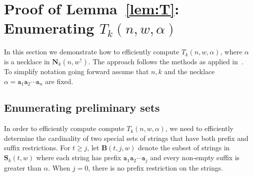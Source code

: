 \documentclass[US-letter,USenglish,authorcolumns,autoref]{lipics-v2021}
\renewcommand{\tt} {\mathtt}
\newcommand{\bS}{\mathbf{S}}
\newcommand{\bN}{\mathbf{N}}
\begin{document}


\section{Proof of Lemma~\ref{lem:T}: Enumerating $T_k(n,w,\alpha)$} \label{sec:rank}

In this section we demonstrate how to efficiently compute $T_k(n,w,\alpha)$, where $\alpha$ is a necklace in $\bN_k(n,w^\uparrow)$. 
The approach follows the methods as applied in~\cite{ranking,hartman}.
%
To simplify notation going forward assume that $n,k$ and the necklace $\alpha = \tt{a}_1\tt{a}_2\cdots \tt{a}_n$ are fixed. 


\subsection{Enumerating preliminary sets} \label{sec:B}

In order to efficiently compute compute $T_k(n,w,\alpha)$, we need to efficiently determine the cardinality of two special sets of strings that have both prefix and suffix restrictions.  For $t \geq j$, let  $\mathbf{B}(t,j,w)$ denote the subset of strings in $\bS_k(t,w)$  where each string has prefix $\tt{a}_1\tt{a}_2\cdots \tt{a}_{j}$ and every non-empty suffix is greater than $\alpha$. 
  When $j=0$, there is no prefix restriction on the strings.
\end{document}
